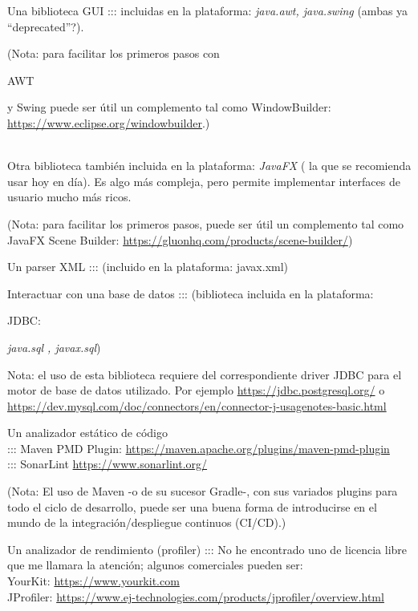 \documentclass[spanish,12pt,a4paper,final,oneside]{book}
\begin{document}
Una biblioteca GUI ::: incluidas en la plataforma: \textit{java.awt, java.swing} (ambas ya ``deprecated''?). \begin{footnotesize}(Nota: para facilitar los primeros pasos con \begin{scriptsize}AWT\end{scriptsize} y Swing puede ser útil un complemento tal como WindowBuilder: \url{https://www.eclipse.org/windowbuilder}.)\end{footnotesize} 
\\ Otra biblioteca también incluida en la plataforma: \textit{JavaFX} ( la que se recomienda usar hoy en día). Es algo más compleja, pero permite implementar interfaces de usuario mucho más ricos.  \begin{footnotesize}(Nota: para facilitar los primeros pasos, puede ser útil un complemento tal como JavaFX Scene Builder: \url{https://gluonhq.com/products/scene-builder/})\end{footnotesize} 

Un parser XML ::: (incluido en la plataforma: javax.xml)

Interactuar con una base de datos ::: (biblioteca incluida en la plataforma: \begin{footnotesize}JDBC:\end{footnotesize}  \textit{java.sql , javax.sql}) \begin{footnotesize} Nota: el uso de esta biblioteca requiere del correspondiente driver JDBC para el motor de base de datos utilizado. Por ejemplo \url{https://jdbc.postgresql.org/} o \url{https://dev.mysql.com/doc/connectors/en/connector-j-usagenotes-basic.html}\end{footnotesize}

Un analizador estático de código 
\\::: Maven PMD Plugin: \url{https://maven.apache.org/plugins/maven-pmd-plugin} 
\\::: SonarLint \url{https://www.sonarlint.org/}

\begin{footnotesize}
(Nota: El uso de Maven -o de su sucesor Gradle-, con sus variados plugins para todo el ciclo de desarrollo, puede ser una buena forma de introducirse en el mundo de la integración/despliegue continuos (CI/CD).)
\end{footnotesize}

Un analizador de rendimiento (profiler) ::: No he encontrado uno de licencia libre que me llamara la atención; algunos comerciales pueden ser: 
\\YourKit: \url{https://www.yourkit.com}  
\\JProfiler: \url{https://www.ej-technologies.com/products/jprofiler/overview.html}
\end{document}
